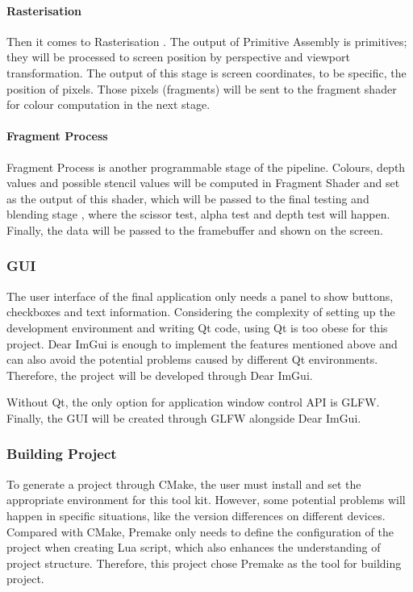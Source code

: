 \paragraph{Rasterisation}

Then it comes to Rasterisation \cite{pipeall}. The output of Primitive Assembly is primitives; they will be processed to screen position by perspective and viewport transformation. The output of this stage is screen coordinates, to be specific, the position of pixels. Those pixels (fragments) will be sent to the fragment shader for colour computation in the next stage.

\paragraph{Fragment Process}

Fragment Process \cite{pipeall} is another programmable stage of the pipeline. Colours, depth values and possible stencil values will be computed in Fragment Shader \cite{fs} and set as the output of this shader, which will be passed to the final testing and blending stage \cite{psp} , where the scissor test, alpha test and depth test will happen. Finally, the data will be passed to the framebuffer and shown on the screen.

\subsubsection{GUI}

The user interface of the final application only needs a panel to show buttons, checkboxes and text information. Considering the complexity of setting up the development environment and writing Qt code, using Qt is too obese for this project. Dear ImGui is enough to implement the features mentioned above and can also avoid the potential problems caused by different Qt environments. Therefore, the project will be developed through Dear ImGui.

\hspace*{\fill}

Without Qt, the only option for application window control API is GLFW. Finally, the GUI will be created through GLFW alongside Dear ImGui.

\subsubsection{Building Project}
\label{premake2}

To generate a project through CMake, the user must install and set the appropriate environment for this tool kit. However, some potential problems will happen in specific situations, like the version differences on different devices. Compared with CMake, Premake only needs to define the configuration of the project when creating Lua script, which also enhances the understanding of project structure. Therefore, this project chose Premake as the tool for building project.

